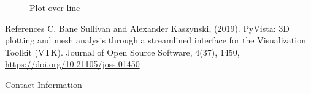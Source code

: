 \documentclass[final]{beamer}
\begin{document}
\begin{frame}[fragile]
\begin{textblock*}{800pt}
\begin{figure}
\caption{Plot over line}
\end{figure}
\begin{block}{References}
C. Bane Sullivan and Alexander Kaszynski, (2019). PyVista: 3D plotting and mesh analysis through a streamlined interface for the Visualization Toolkit (VTK). Journal of Open Source Software, 4(37), 1450, \url{https://doi.org/10.21105/joss.01450}
\end{block}
\begin{block}{Contact Information}
\doclicenseThis
\end{block}
\end{textblock*}

\end{frame}
\end{document}
